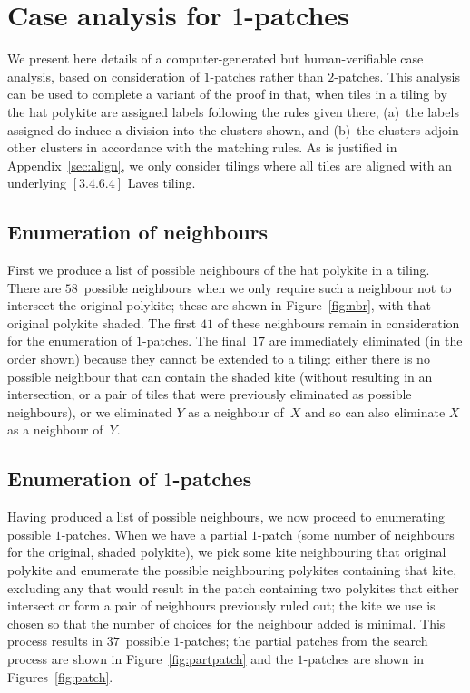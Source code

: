 \section{Case analysis for $1$-patches}
\label{sec:patches}

We present here details of a computer-generated but human-verifiable
case analysis, based on consideration of $1$-patches rather than
$2$-patches.  This analysis can be used to complete a variant of the
proof in  that,
when tiles in a tiling by the hat polykite
are assigned labels following the rules given there, (a)~the labels
assigned do induce a division into the clusters shown, and (b)~the
clusters adjoin other clusters in accordance with the matching rules.
As is justified in Appendix~\ref{sec:align}, we only consider tilings
where all tiles are aligned with an underlying $[3.4.6.4]$ Laves
tiling.

\subsection{Enumeration of neighbours}

First we produce a list of possible neighbours of the hat polykite in a
tiling.  There are $58$~possible neighbours when we only require such
a neighbour not to intersect the original polykite; these are shown in
Figure~\ref{fig:nbr}, with that original polykite shaded.  The first
$41$ of these neighbours remain in consideration for the enumeration
of $1$-patches.  The final~$17$ are immediately eliminated (in the
order shown) because they cannot be extended to a tiling: either there
is no possible neighbour that can contain the shaded kite (without
resulting in an intersection, or a pair of tiles that were previously
eliminated as possible neighbours), or we eliminated $Y$ as a
neighbour of~$X$ and so can also eliminate $X$ as a neighbour of~$Y$.



\FloatBarrier

\subsection{Enumeration of $1$-patches}

Having produced a list of possible neighbours, we now proceed to
enumerating possible $1$-patches.  When we have a partial $1$-patch
(some number of neighbours for the original, shaded polykite), we pick
some kite neighbouring that original polykite and enumerate the
possible neighbouring polykites containing that kite, excluding any
that would result in the patch containing two polykites that either
intersect or form a pair of neighbours previously ruled out; the kite
we use is chosen so that the number of choices for the neighbour added
is minimal.  This process results in $37$~possible $1$-patches; the
partial patches from the search process are shown in
Figure~\ref{fig:partpatch} and the $1$-patches are shown in
Figures~\ref{fig:patch}.


